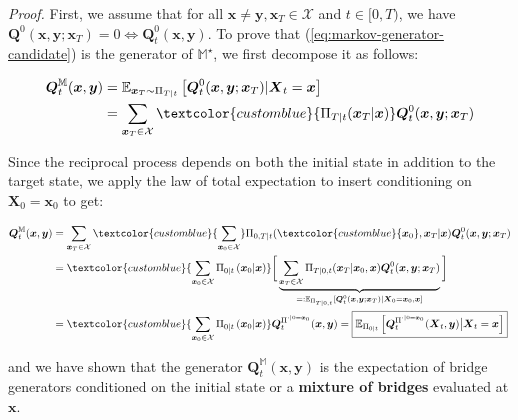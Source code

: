 \documentclass{article}
\newcommand{\bluetext}[1]{\textcolor{customblue}{#1}}
\begin{document}
\textit{Proof.} First, we assume that for all $\boldsymbol{x}\neq \boldsymbol{y}, \boldsymbol{x}_T\in \mathcal{X}$ and $t\in [0,T)$, we have $\boldsymbol{Q}^0(\boldsymbol{x},\boldsymbol{y}; \boldsymbol{x}_T)=0\iff \boldsymbol{Q}_t^0(\boldsymbol{x}, \boldsymbol{y})$. To prove that (\ref{eq:markov-generator-candidate}) is the generator of $\mathbb{M}^\star$, we first decompose it as follows:
\begin{small}
\begin{align}
    \boldsymbol{Q}^{\mathbb{M}}_t(\boldsymbol{x}, \boldsymbol{y})&=\mathbb{E}_{\boldsymbol{x}_T\sim\Pi_{T|t}}\left[\boldsymbol{Q}_t^0(\boldsymbol{x}, \boldsymbol{y};\boldsymbol{x}_T)|\boldsymbol{X}_t=\boldsymbol{x}\right]\nonumber\\
    &= \sum_{\boldsymbol{x}_T\in \mathcal{X}}\bluetext{\Pi_{T|t}(\boldsymbol{x}_T|\boldsymbol{x})}\boldsymbol{Q}_t^0(\boldsymbol{x}, \boldsymbol{y};\boldsymbol{x}_T)
\end{align}
\end{small}
Since the reciprocal process depends on both the initial state in addition to the target state, we apply the law of total expectation to insert conditioning on $\boldsymbol{X}_0=\boldsymbol{x}_0$ to get:
\begin{small}
\begin{align}
    \boldsymbol{Q}^{\mathbb{M}}_t(\boldsymbol{x}, \boldsymbol{y})&=\sum_{\boldsymbol{x}_T\in \mathcal{X}}\bluetext{\sum_{\boldsymbol{x}_0\in \mathcal{X}}}\Pi_{0,T|t}(\bluetext{\boldsymbol{x}_0},\boldsymbol{x}_T|\boldsymbol{x})\boldsymbol{Q}_t^0(\boldsymbol{x}, \boldsymbol{y};\boldsymbol{x}_T)\nonumber\\
    &=\bluetext{\sum_{\boldsymbol{x}_0\in \mathcal{X}}\Pi_{0|t}\left(\boldsymbol{x}_0|\boldsymbol{x}\right)}\bigg[\underbrace{\sum_{\boldsymbol{x}_T\in \mathcal{X}}\Pi_{T|0,t}(\boldsymbol{x}_T|\boldsymbol{x}_0,\boldsymbol{x})\boldsymbol{Q}_t^0(\boldsymbol{x}, \boldsymbol{y};\boldsymbol{x}_T)}_{=:\mathbb{E}_{\Pi_{T|0,t}}[\boldsymbol{Q}_t^0(\boldsymbol{x},\boldsymbol{y};\boldsymbol{x}_T)|\boldsymbol{X}_0=\boldsymbol{x}_0, \boldsymbol{x}]}\bigg]\nonumber\\
    &=\bluetext{\sum_{\boldsymbol{x}_0\in \mathcal{X}}\Pi_{0|t}\left(\boldsymbol{x}_0|\boldsymbol{x}\right)}\boldsymbol{Q}_t^{\Pi^{\cdot|0=\boldsymbol{x}_0}}(\boldsymbol{x},\boldsymbol{y})=\boxed{\mathbb{E}_{\Pi_{0|t}}\left[\boldsymbol{Q}_t^{\Pi^{\cdot|0=\boldsymbol{x}_0}}(\boldsymbol{X}_t,\boldsymbol{y})\big|\boldsymbol{X}_t=\boldsymbol{x}\right]}
\end{align}
\end{small}
and we have shown that the generator $\boldsymbol{Q}^{\mathbb{M}}_t(\boldsymbol{x}, \boldsymbol{y})$ is the expectation of bridge generators conditioned on the initial state or a \textbf{mixture of bridges} evaluated at $\boldsymbol{x}$. 
\end{document}
